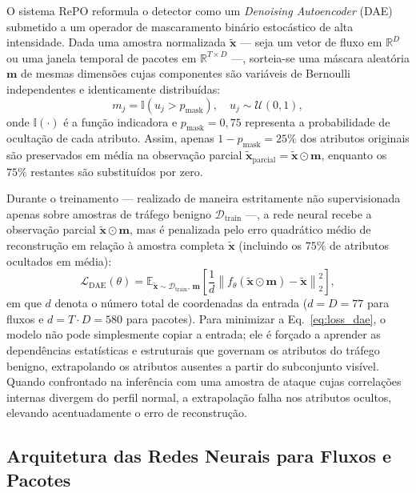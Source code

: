 \documentclass[conference]{IEEEtran}
\begin{document}
O sistema RePO reformula o detector como um \textit{Denoising Autoencoder} (DAE) \cite{vincent2008} submetido a um operador de mascaramento binário estocástico de alta intensidade.
Dada uma amostra normalizada $\tilde{\mathbf{x}}$ — seja um vetor de fluxo em $\mathbb{R}^{D}$ ou uma janela temporal de pacotes em $\mathbb{R}^{T \times D}$ —, sorteia-se uma máscara aleatória $\mathbf{m}$ de mesmas dimensões cujas componentes são variáveis de Bernoulli independentes e identicamente distribuídas:
\begin{equation}
m_j = \mathbb{I}\!\left(u_j > p_{\text{mask}}\right), \quad u_j \sim \mathcal{U}(0, 1),
\label{eq:bernoulli_mask}
\end{equation}
onde $\mathbb{I}(\cdot)$ é a função indicadora e $p_{\text{mask}} = 0{,}75$ representa a probabilidade de ocultação de cada atributo.
Assim, apenas $1 - p_{\text{mask}} = 25\%$ dos atributos originais são preservados em média na observação parcial $\tilde{\mathbf{x}}_{\text{parcial}} = \tilde{\mathbf{x}} \odot \mathbf{m}$, enquanto os $75\%$ restantes são substituídos por zero.

Durante o treinamento — realizado de maneira estritamente não supervisionada apenas sobre amostras de tráfego benigno $\mathcal{D}_{\text{train}}$ —, a rede neural recebe a observação parcial $\tilde{\mathbf{x}} \odot \mathbf{m}$, mas é penalizada pelo erro quadrático médio de reconstrução em relação à amostra completa $\tilde{\mathbf{x}}$ (incluindo os $75\%$ de atributos ocultados em média):
\begin{equation}
\mathcal{L}_{\text{DAE}}(\theta) = \mathbb{E}_{\tilde{\mathbf{x}} \sim \mathcal{D}_{\text{train}},\, \mathbf{m}}\!\left[ \frac{1}{d} \left\| f_{\theta}\!\left(\tilde{\mathbf{x}} \odot \mathbf{m}\right) - \tilde{\mathbf{x}} \right\|_2^2 \right],
\label{eq:loss_dae}
\end{equation}
em que $d$ denota o número total de coordenadas da entrada ($d = D = 77$ para fluxos e $d = T \cdot D = 580$ para pacotes).
Para minimizar a Eq.~\eqref{eq:loss_dae}, o modelo não pode simplesmente copiar a entrada; ele é forçado a aprender as dependências estatísticas e estruturais que governam os atributos do tráfego benigno, extrapolando os atributos ausentes a partir do subconjunto visível.
Quando confrontado na inferência com uma amostra de ataque cujas correlações internas divergem do perfil normal, a extrapolação falha nos atributos ocultos, elevando acentuadamente o erro de reconstrução.

\subsection{Arquitetura das Redes Neurais para Fluxos e Pacotes}
\end{document}
